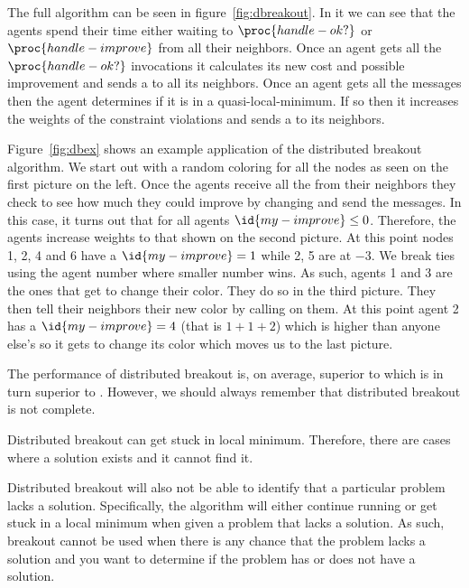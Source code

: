 The full algorithm can be seen in figure~\ref{fig:dbreakout}. In it we
can see that the agents spend their time either waiting to
$\proc{handle-ok?}$ or $\proc{handle-improve}$ from all their
neighbors. Once an agent gets all the $\proc{handle-ok?}$ invocations
it calculates its new cost and possible improvement and sends a
 to all its neighbors.  Once an agent gets all
the  messages then the agent determines if it is
in a quasi-local-minimum.  If so then it increases the weights of the
constraint violations and sends a  to its neighbors.

 Figure~\ref{fig:dbex} shows an example application of
the distributed breakout algorithm. We start out with a random
coloring for all the nodes as seen on the first picture on the left.
Once the agents receive all the  from their neighbors
they check to see how much they could improve by changing and send the
 messages. In this case, it turns out that for
all agents $\id{my-improve} \leq 0$. Therefore, the agents increase
weights to that shown on the second picture. At this point nodes 1, 2,
4 and 6 have a $\id{my-improve} = 1$ while 2, 5 are at $-3$. We break
ties using the agent number where smaller number wins. As such, agents
1 and 3 are the ones that get to change their color. They do so in the
third picture. They then tell their neighbors their new color by
calling  on them. At this point agent 2 has a
$\id{my-improve} = 4$ (that is $1 + 1 + 2$) which is higher than
anyone else's so it gets to change its color which moves us to the
last picture.

The performance of distributed breakout is, on average, superior to
 which is in turn superior to .  However, we
should always remember that distributed breakout is not complete.

\begin{theorem}
\label{th:dbnotc}
  Distributed breakout can get stuck in local minimum. Therefore,
  there are cases where a solution exists and it cannot find it.
\end{theorem}

Distributed breakout will also not be able to identify that a
particular problem lacks a solution. Specifically, the algorithm will
either continue running or get stuck in a local minimum when given a
problem that lacks a solution. As such, breakout cannot be used when
there is any chance that the problem lacks a solution and you want to
determine if the problem has or does not have a solution.

